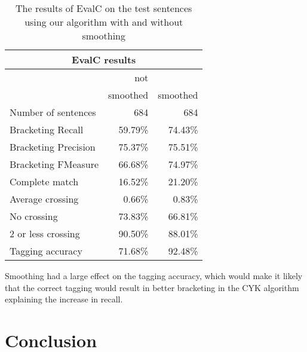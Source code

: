 \documentclass[11pt,twocolumn]{article}
\begin{document}
\begin{table}[!htb]
\centering
\begin{tabular}{|l|r|r|}
\hline
\multicolumn{3}{|c|}{EvalC results}\\
\hline
& not  & \\
& smoothed & smoothed  \\
\hline
Number of sentences     & 684 & 684 \\
Bracketing Recall         &  59.79\% & 74.43\% \\
Bracketing Precision      &  75.37\% & 75.51\% \\
Bracketing FMeasure       &  66.68\% & 74.97\% \\
Complete match            &  16.52\% & 21.20\% \\
Average crossing          &   0.66\% & 0.83\% \\
No crossing               &  73.83\% & 66.81\% \\
2 or less crossing        &  90.50\% & 88.01\% \\
Tagging accuracy          &  71.68\% & 92.48\% \\
\hline
\end{tabular}
\caption{The results of EvalC on the test sentences using our algorithm with and without smoothing}
\label{tab:results}
\end{table}

Smoothing had a large effect on the tagging accuracy, which would make it likely that the correct tagging would result in better bracketing in the CYK algorithm explaining the increase in recall.


\section{Conclusion}




\end{document}
